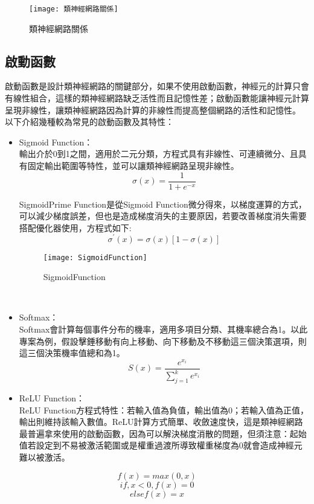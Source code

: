 \newpage
\begin{figure}
\begin{center}
\texttt{[image: 類神經網路關係]}
\caption{\Large 類神經網路關係}
\label{類神經網路關係}
\end{center}
\end{figure}
\subsection{啟動函數}
啟動函數是設計類神經網路的關鍵部分，如果不使用啟動函數，神經元的計算只會有線性組合，這樣的類神經網路缺乏活性而且記憶性差；啟動函數能讓神經元計算呈現非線性，讓類神經網路因為計算的非線性而提高整個網路的活性和記憶性。\\
以下介紹幾種較為常見的啟動函數及其特性：
\begin{itemize}
\item Sigmoid Function：\\
輸出介於0到1之間，適用於二元分類，方程式具有非線性、可連續微分、且具有固定輸出範圍等特性，並可以讓類神經網路呈現非線性。\\
$$\sigma(x)=\frac{1}{1+e^{-x}}$$

SigmoidPrime Function是從Sigmoid Function微分得來，以梯度運算的方式，可以減少梯度誤差，但也是造成梯度消失的主要原因，若要改善梯度消失需要搭配優化器使用，方程式如下:\\
$$\sigma^{'}(x)=\sigma(x)[1-\sigma(x)]$$
\begin{figure}
\begin{center}
\texttt{[image: SigmoidFunction]}
\caption{\Large SigmoidFunction}\label{SigmoidFunction}
\end{center}
\end{figure}
\\
\item Softmax：\\
Softmax會計算每個事件分布的機率，適用多項目分類、其機率總合為1。以此專案為例，假設擊錘移動有向上移動、向下移動及不移動這三個決策選項，則這三個決策機率值總和為1。\\
$$S(x)=\frac{e^{x_i}}{\sum^k_{j=1}e^{x_i}}$$
\item ReLU Function：\\
ReLU Function方程式特性：若輸入值為負值，輸出值為0；若輸入值為正值，輸出則維持該輸入數值。ReLU計算方式簡單、收斂速度快，這是類神經網路最普遍拿來使用的啟動函數，因為可以解決梯度消散的問題，但須注意：起始值若設定到不易被激活範圍或是權重過渡所導致權重梯度為0就會造成神經元難以被激活。\\
\end{itemize}
$$f(x)=max(0,x)$$
$$if , x<0 , f(x)=0$$
$$else f(x)=x$$
